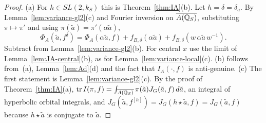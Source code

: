 \begin{proof}
(a) For $h\in SL(2,k_S)$ this is Theorem~\ref{thm:IA}(b). Let
$h=\delta=\delta_a$. By Lemma~\ref{lem:variance-gl2}(c) and Fourier
inversion on $\overline{A(\mathbb{Q}_S)}$, substituting $\pi\mapsto\pi'$ and using
$\pi(\tilde a)=\pi'(\alpha\tilde a)$,
\[
\Phi_A(\tilde a,f^\delta)=\Phi_A(\alpha\tilde a,f)+f_{B,\delta}(\alpha
\tilde a)+f_{B,\delta}(w\,\alpha\tilde a\,w^{-1}).
\]
Subtract from Lemma~\ref{lem:variance-gl2}(b). For central $x$ use the
limit of Lemma~\ref{lem:JA-central}(b), as for
Lemma~\ref{lem:variance-local}(c). (b) follows from~(a),
Lemma~\ref{lem:Ad}(d) and the fact that $I_A(\cdot,f)$ is anti-genuine.
(c) The first statement is Lemma~\ref{lem:variance-gl2}(c). By the proof
of Theorem~\ref{thm:IA}(a), $\operatorname{tr}I(\pi,f)=\int_{\overline{A(\mathbb{Q}_S)}}\pi(\tilde
a)J_G(\tilde a,f)\,d\tilde a$, an integral of hyperbolic orbital
integrals, and $J_G(\tilde a,f^{[h]})=J_G(h\star\tilde a,f)=J_G(\tilde
a,f)$ because $h\star\tilde a$ is conjugate to $\tilde a$.
\end{proof}

